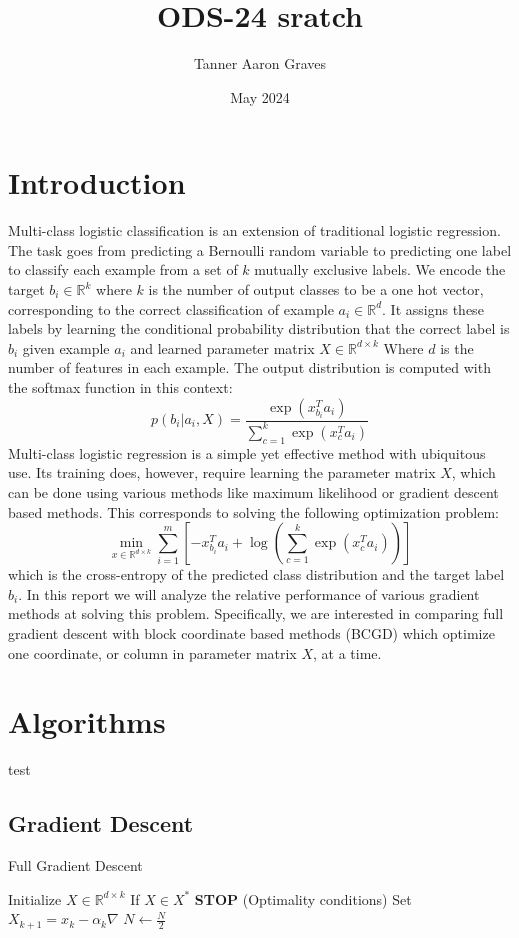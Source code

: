 \documentclass{article}
\title{ODS-24 sratch}
\author{Tanner Aaron Graves}
\date{May 2024}
\begin{document}
\maketitle

\section{Introduction}
Multi-class logistic classification is an extension of traditional logistic regression. The task goes from predicting a Bernoulli random variable to predicting one label to classify each example from a set of $k$ mutually exclusive labels. We encode the target $b_i \in \mathbb{R}^k$ where $k$ is the number of output classes to be a one hot vector, corresponding to the correct classification of example $a_i \in \mathbb{R}^d$. It assigns these labels by learning the conditional probability distribution that the correct label is $b_i$ given example $a_i$ and learned parameter matrix $X \in \mathbb{R}^{d \times k}$ Where $d$ is the number of features in each example. The output distribution is computed with the softmax function in this context: 
$$p(b_i|a_i, X) = \frac{\exp(x_{b_i}^T a_i)}{\sum_{c=1}^k\exp(x_c^Ta_i)}$$
Multi-class logistic regression is a simple yet effective method with ubiquitous use. Its training does, however, require learning the parameter matrix $X$, which can be done using various methods like maximum likelihood or gradient descent based methods. This corresponds to solving the following optimization problem:
$$\min_{x\in\mathbb{R}^{d\times k}} \sum\limits_{i=1}^{m}[-x^T_{b_i}a_{i}+ \log(\sum\limits_{c=1}^k\exp(x_c^{T}a_i))]$$
which is the cross-entropy of the predicted class distribution and the target label $b_i$.  
In this report we will analyze the relative performance of various gradient methods at solving this problem. Specifically, we are interested in comparing full gradient descent with block coordinate based methods (BCGD) which optimize one coordinate, or column in parameter matrix $X$, at a time.
\section{Algorithms}
test
\subsection{Gradient Descent}
\begin{algorithm}
\caption{Full Gradient Descent}\label{alg:cap}
\begin{algorithmic}
\State Initialize $X \in \mathbb{R}^{d\times k}$
    \State If $X \in X^*$ \textbf{STOP} (Optimality conditions)
    \State Set $X_{k+1} = x_k - \alpha_{k}\nabla$
    \State $N \gets \frac{N}{2}$  
\EndFor
\end{algorithmic}
\end{algorithm}
\end{document}
